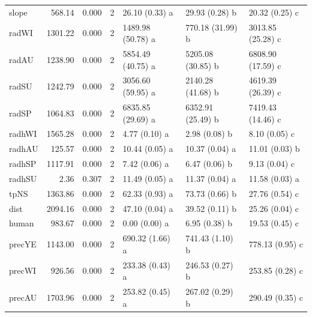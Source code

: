 \begin{table}
\begin{tabular}{lrrllll}
\hspace{1em}slope & 568.14 & 0.000 & 2 & 26.10 (0.33) a & 29.93 (0.28) b & 20.32 (0.25) c\\
\hspace{1em}radWI & 1301.22 & 0.000 & 2 & 1489.98 (50.78) a & 770.18 (31.99) b & 3013.85 (25.28) c\\
\hspace{1em}radAU & 1238.90 & 0.000 & 2 & 5854.49 (40.75) a & 5205.08 (30.85) b & 6808.90 (17.59) c\\
\hspace{1em}radSU & 1242.79 & 0.000 & 2 & 3056.60 (59.95) a & 2140.28 (41.68) b & 4619.39 (26.39) c\\
\hspace{1em}radSP & 1064.83 & 0.000 & 2 & 6835.85 (29.69) a & 6352.91 (25.49) b & 7419.43 (14.46) c\\
\hspace{1em}radhWI & 1565.28 & 0.000 & 2 & 4.77 (0.10) a & 2.98 (0.08) b & 8.10 (0.05) c\\
\hspace{1em}radhAU & 125.57 & 0.000 & 2 & 10.44 (0.05) a & 10.37 (0.04) a & 11.01 (0.03) b\\
\hspace{1em}radhSP & 1117.91 & 0.000 & 2 & 7.42 (0.06) a & 6.47 (0.06) b & 9.13 (0.04) c\\
\hspace{1em}radhSU & 2.36 & 0.307 & 2 & 11.49 (0.05) a & 11.37 (0.04) a & 11.58 (0.03) a\\
\hspace{1em}tpNS & 1363.86 & 0.000 & 2 & 62.33 (0.93) a & 73.73 (0.66) b & 27.76 (0.54) c\\
\hspace{1em}dist & 2094.16 & 0.000 & 2 & 47.10 (0.04) a & 39.52 (0.11) b & 25.26 (0.04) c\\
\hspace{1em}human & 983.67 & 0.000 & 2 & 0.00 (0.00) a & 6.95 (0.38) b & 19.53 (0.45) c\\
\hspace{1em}precYE & 1143.00 & 0.000 & 2 & 690.32 (1.66) a & 741.43 (1.10) b & 778.13 (0.95) c\\
\hspace{1em}precWI & 926.56 & 0.000 & 2 & 233.38 (0.43) a & 246.53 (0.27) b & 253.85 (0.28) c\\
\hspace{1em}precAU & 1703.96 & 0.000 & 2 & 253.82 (0.45) a & 267.02 (0.29) b & 290.49 (0.35) c\\

\end{tabular}
\end{table}
